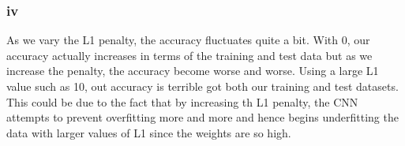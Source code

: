 \documentclass[11pt]{article} %
\begin{document}
\subsubsection{iv}
As we vary the L1 penalty,  the accuracy fluctuates quite a bit.  With 0, our accuracy actually increases in terms of the training and test data but as we increase the penalty,  the accuracy become worse and worse.  Using a large L1 value such as 10, out accuracy is terrible got both our training and test datasets. This could be due to the fact that by increasing th L1 penalty, the CNN attempts to prevent overfitting more and more and hence begins underfitting the data with larger values of L1 since the weights are so high.
\begin{figure}[h]
\centering
{}
\qquad
{}
\qquad 
{}

\end{figure}
\end{document}
